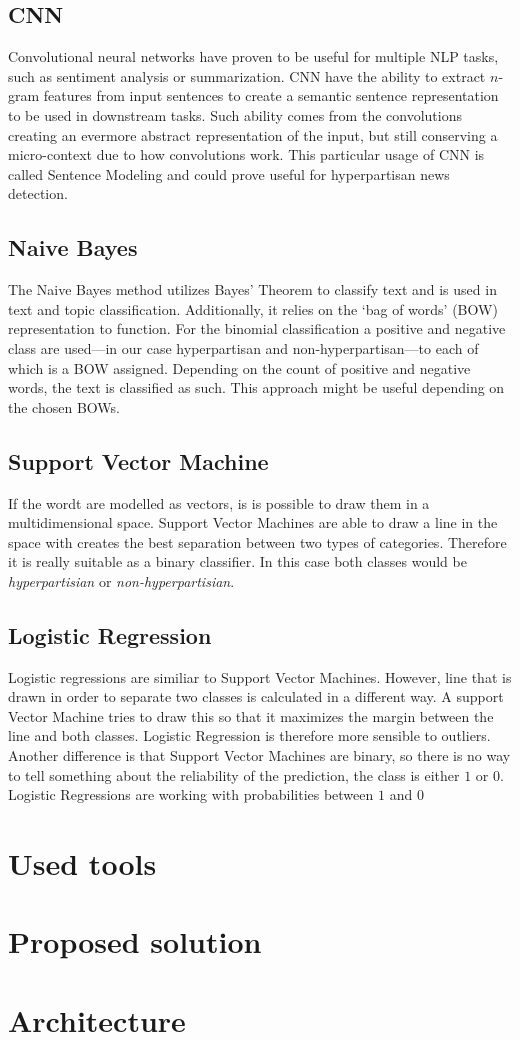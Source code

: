 \documentclass{article}
\begin{document}
\subsection{CNN}
Convolutional  neural networks have proven to be useful for multiple NLP tasks, such as sentiment analysis or summarization.
CNN have the ability to extract $n$-gram features from input sentences to create a semantic sentence representation to be used in downstream tasks.
Such ability comes from the convolutions creating an evermore abstract representation of the input, but still conserving a micro-context due to how convolutions work.
This particular usage of CNN is called Sentence Modeling and could prove useful for hyperpartisan news detection.

\subsection{Naive Bayes}
The Naive Bayes method utilizes Bayes' Theorem to classify text and is used in text and topic classification.
Additionally, it relies on the `bag of words' (BOW) representation to function.
For the binomial classification a positive and negative class are used---in our case hyperpartisan and non-hyperpartisan---to each of which is a BOW assigned.
Depending on the count of positive and negative words, the text is classified as such.
This approach might be useful depending on the chosen BOWs.

\subsection{Support Vector Machine}
If the wordt are modelled as vectors, is is possible to draw them in a multidimensional space. Support Vector Machines are able to draw a line in the space with creates the best separation between two types of categories. Therefore it is really suitable as a binary classifier. In this case both classes would be \textit{hyperpartisian} or \textit{non-hyperpartisian}.

\subsection{Logistic Regression}
Logistic regressions are similiar to Support Vector Machines. However, line that is drawn in order to separate two classes is calculated in a different way. A support Vector Machine tries to draw this so that it maximizes the margin between the line and both classes. Logistic Regression is therefore more sensible to outliers. Another difference is that Support Vector Machines are binary, so there is no way to tell something about the reliability of the prediction, the class is either $1$ or $0$. Logistic Regressions are working with probabilities between $1$ and $0$

\section{Used tools}

\section{Proposed solution}

\section{Architecture}
\end{document}
